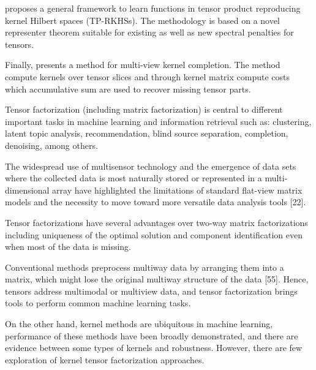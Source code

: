\documentclass[letterpaper,12pt]{article}
\begin{document}
\cite{Signoretto2013} proposes a general framework to learn functions in tensor product reproducing kernel Hilbert spaces (TP-RKHSs). The methodology is based on a novel representer theorem suitable for existing as well as new spectral penalties for tensors.

Finally, \cite{Bhadra2016} presents a method for multi-view kernel completion. The method compute kernels over tensor slices and through kernel matrix compute costs which accumulative sum are used to recover missing tensor parts.


Tensor factorization (including matrix factorization) is central to different important tasks in machine learning and information retrieval such as: clustering, latent topic analysis, recommendation, blind source separation, completion, denoising, among others. 

The widespread use of multisensor technology and the emergence of data sets where the collected data is most naturally stored or represented in a multi-dimensional array have highlighted the limitations of standard flat-view matrix models and the necessity to move toward more versatile data analysis tools [22]. %


Tensor factorizations have several advantages over two-way matrix factorizations including uniqueness of the optimal solution and component identification even when most of the data is missing.\cite{Morup2011}

Conventional methods preprocess multiway data by arranging them into a matrix, which might lose the original multiway structure of the data [55]. Hence, tensors address multimodal or multiview data, and tensor factorization brings tools to perform common machine learning tasks.

On the other hand, kernel methods are ubiquitous in machine learning, performance of these methods have been broadly demonstrated, and there are evidence between some types of kernels and robustness. However, there are few exploration of kernel tensor factorization approaches.


\end{document}
